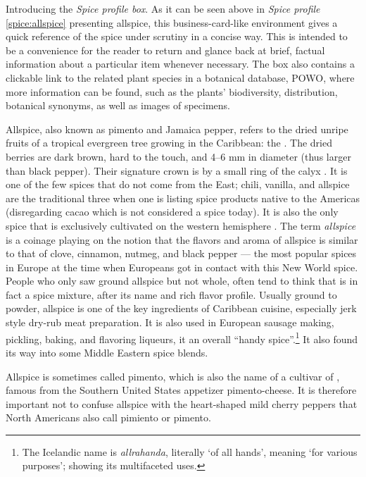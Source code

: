 \begin{note}
	Introducing the \textit{Spice profile box}. As it can be seen above in \textit{Spice profile} \ref{spice:allspice} presenting allspice, this business-card-like environment gives a quick reference of the spice under scrutiny in a concise way. This is intended to be a convenience for the reader to return and glance back at brief, factual information about a particular item whenever necessary. The box also contains a clickable link to the related plant species in a botanical database, \gls{POWO}, where more information can be found, such as the plants' biodiversity, distribution, botanical synonyms, as well as images of specimens.
\end{note}

\noindent Allspice, also known as pimento and Jamaica pepper, refers to the dried unripe fruits of a tropical evergreen tree growing in the Caribbean: the . The dried berries are dark brown, hard to the touch, and 4--6 mm in diameter (thus larger than black pepper). Their signature crown is by a small ring of the calyx \autocite[210]{van_wyk_culinary_2014}. It is one of the few spices that do not come from the East; chili, vanilla, and allspice are the traditional three when one is listing spice products native to the Americas (disregarding cacao which is not considered a spice today). It is also the only spice that is exclusively cultivated on the western hemisphere \autocite[21]{duke_crc_2002}. The term \textit{allspice} is a coinage playing on the notion that the flavors and aroma of allspice is similar to that of clove, cinnamon, nutmeg, and black pepper \autocite[717]{mabberley_mabberleys_2017} --- the most popular spices in Europe at the time when Europeans got in contact with this New World spice. People who only saw ground allspice but not whole, often tend to think that is in fact a spice mixture, after its name and rich flavor profile. Usually ground to powder, allspice is one of the key ingredients of Caribbean cuisine, especially jerk style dry-rub meat preparation. It is also used in European sausage making, pickling, baking, and flavoring liqueurs, it an overall ``handy spice''.\footnote{The Icelandic name is \textit{allrahanda}, literally `of all hands', meaning `for various purposes'; showing its multifaceted uses.} It also found its way into some Middle Eastern spice blends.


\begin{note}
\label{note:pimento}
Allspice is sometimes called pimento, which is also the name of a cultivar of , famous from the Southern United States appetizer pimento-cheese. It is therefore important not to confuse allspice with the heart-shaped mild cherry peppers that North Americans also call pimiento or pimento. 
\end{note}

